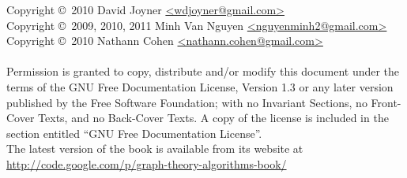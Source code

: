 \noindent Copyright \copyright\ 2010 David Joyner \url{<wdjoyner@gmail.com>} \\
Copyright \copyright\ 2009, 2010, 2011
Minh Van Nguyen \url{<nguyenminh2@gmail.com>} \\
Copyright \copyright\ 2010 Nathann Cohen \url{<nathann.cohen@gmail.com>} \\\\
Permission is granted to copy, distribute and/or modify this document
under the terms of the GNU Free Documentation License, Version 1.3
or any later version published by the Free Software Foundation;
with no Invariant Sections, no Front-Cover Texts, and no
Back-Cover Texts. A copy of the license is included in the section
entitled ``GNU Free Documentation License''. \\

\noindent
The latest version of the book is available from its website at \\

\url{http://code.google.com/p/graph-theory-algorithms-book/}
